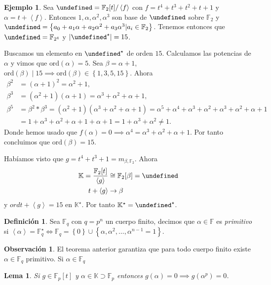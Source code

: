 \documentclass[10pt, spanish]{report}
\newtheorem*{lema}{Lema}
\theoremstyle{definition}
\newtheorem*{defin}{Definición}
\newtheorem*{ej}{Ejemplo}
\newtheorem*{obs}{Observación}
\newcommand{\F}{\mathbb{F}}
\newcommand{\K}{\mathbb{K}}
\let\L\undefined
\newcommand{\L}{\mathbb{L}}
\newcommand{\ord}[1]{\text{ord}(#1)}
\newcommand{\fecha}[1]{\marginpar{\underline{#1}}}
\newcommand{\completar}{\fbox{\textbf{¡Completar!}}}
\begin{document}
\fecha{17/03}
\begin{ej}
    Sea $\L=\F_2[t]/\left<f\right>$ con $f=t^4+t^3+t^2+t+1$ y $\alpha=t+\left<f
    \right>$. Entonces $1,\alpha,\alpha^2,\alpha^3$ son base de $\L$ sobre
    $\F_2$ y $\L=\left\{a_0+a_1\alpha+a_2\alpha^2+a_3\alpha^3|a_i\in\F_2
    \right\}$. Tenemos entonces que $\L=\F_{2^4}$ y $\left|\L^\star\right|=15$.

    Buscamos un elemento en $\L^\star$ de orden $15$. Calculamos las potencias
    de $\alpha$ y vimos que $\ord{\alpha}=5$. Sea $\beta=\alpha+1$, $\ord{\beta}
    \mid 15\implies\ord{\beta}\in\left\{1,3,5,15\right\}$. Ahora 
    \begin{align*}
        \beta^2&=(\alpha+1)^2=\alpha^2+1,\\
        \beta^3&=(\alpha^2+1)(\alpha+1)=\alpha^3+\alpha^2+\alpha+1,\\
        \beta^5&=\beta^2*\beta^3=(\alpha^2+1)(\alpha^3+\alpha^2+\alpha+1)=
        \alpha^5+\alpha^4+\alpha^3+\alpha^2+\alpha^3+\alpha^2+\alpha+1\\
               &=1+\alpha^3+\alpha^2+\alpha+1+\alpha+1=1+\alpha^3+\alpha^2\neq1
    .\end{align*}
    Donde hemos usado que $f(\alpha)=0\implies
    \alpha^4=\alpha^3+\alpha^2+\alpha+1$. Por tanto concluimos que
    $\ord{\beta}=15$. 

    Habíamos visto que $g=t^4+t^3+1=m_{\beta,\F_2}$. Ahora
    \begin{align*}
        \K=\frac{\F_2[t]}{\left<g\right>}&\cong\F_2[\beta]=\L\\
        t+\left<g\right>&\to\beta
    \end{align*}
    y $ord{t+\left< g \right>}=15$ en $\K^\star$. Por tanto $\K^\star=\L^\star$.   
\end{ej}

\begin{defin}
    Sea $\F_q$ con $q=p^n$ un cuerpo finito, decimos que $\alpha\in\F$ es
    \textit{primitivo} si $\left< \alpha \right> =\F_q^\star\Leftrightarrow \F_q
    =\left\{0\right\}\cup\left\{\alpha,\alpha^2,\ldots,\alpha^{n-1}=1\right\}$.
\end{defin}

\begin{obs}
    El teorema anterior garantiza que para todo cuerpo finito existe
    $\alpha\in\F_q$ primitivo. Si $\alpha\in\F_q$ 
    \completar %
\end{obs}

\begin{lema}
    Si $g\in\F_p[t]$ y $\alpha\in\K\supset\F_p$ entonces $g(\alpha)=0\implies
    g(\alpha^p)=0$.   
\end{lema}
\end{document}

